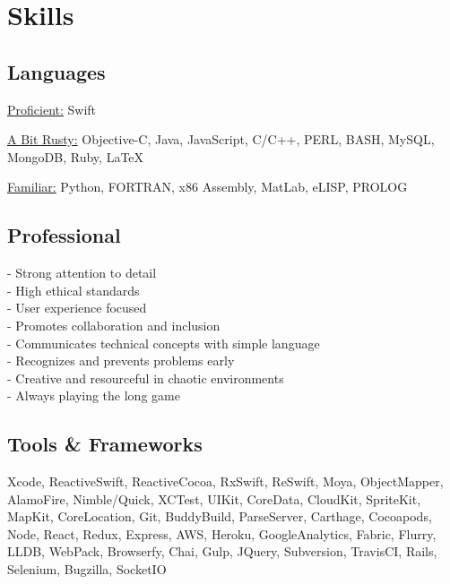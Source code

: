 \documentclass[]{jhearn-resume}
\begin{document}
\begin{minipage}[t]{0.34\textwidth} 

\section{Skills}
\subsection{Languages}
\underline{Proficient:} Swift \par
\underline{A Bit Rusty:} Objective-C, Java, JavaScript, C/C++, PERL, BASH, MySQL, MongoDB, Ruby, { \LaTeX} \par
\underline{Familiar:} Python, FORTRAN, x86 Assembly, MatLab, eLISP, PROLOG \\
\sectionsep
\vspace{-\topsep}

\subsection{Professional}
{\raggedright - Strong attention to detail\\
- High ethical standards\\
- User experience focused\\
- Promotes collaboration and inclusion\\
- Communicates technical concepts with simple language\\
- Recognizes and prevents problems early\\
- Creative and resourceful in chaotic environments\\
- Always playing the long game}
\sectionsep

\subsection{Tools \& Frameworks}
\raggedright Xcode, ReactiveSwift, ReactiveCocoa, RxSwift, ReSwift, Moya, ObjectMapper, AlamoFire, Nimble/Quick, XCTest, UIKit, CoreData, CloudKit, SpriteKit, MapKit, CoreLocation, Git, BuddyBuild, ParseServer, Carthage, Cocoapods, Node, React, Redux, Express, AWS, Heroku, GoogleAnalytics, Fabric, Flurry, LLDB,  WebPack, Browserfy, Chai, Gulp, JQuery, Subversion, TravisCI, Rails, Selenium, Bugzilla, SocketIO
\sectionsep


\end{minipage}
\end{document}
